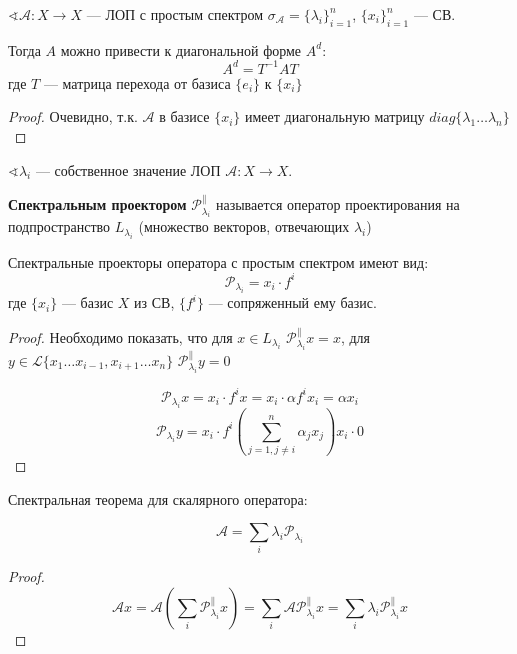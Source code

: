 \begin{theorem}
    $\sphericalangle \mathcal A : X \to X$ --- ЛОП с простым спектром $\sigma_{\mathcal A} = \{\lambda_i\}_{i=1}^n$, $\{x_i\}_{i=1}^n$ --- СВ.

    Тогда $A$ можно привести к диагональной форме $A^d$:
    $$A^d = T^{-1} A T$$
    где $T$ --- матрица перехода от базиса $\{e_i\}$ к $\{x_i\}$
\end{theorem}
\begin{proof}
    Очевидно, т.к. $\mathcal A$ в базисе $\{x_i\}$ имеет диагональную матрицу $diag\{\lambda_1 \ldots \lambda_n\}$
\end{proof}

\begin{definition}
    $\sphericalangle \lambda_i$ --- собственное значение ЛОП $\mathcal A : X\to X$.

    \textbf{Спектральным проектором} $\mathcal P_{\lambda_i}^{\parallel}$ называется оператор проектирования на подпространство $L_{\lambda_i}$ (множество векторов, отвечающих $\lambda_i$)
\end{definition}

\begin{lemma}
    Спектральные проекторы оператора с простым спектром имеют вид:
    $$\mathcal P_{\lambda_i} = x_i \cdot f^i$$
    где $\{x_i\}$ --- базис $X$ из СВ, $\{f^i\}$ --- сопряженный ему базис.
\end{lemma}
\begin{proof}
    Необходимо показать, что для $x\in L_{\lambda_i}$ $\mathcal P_{\lambda_i}^{\parallel} x=x$, для $y\in \mathcal L\{x_1\ldots x_{i-1}, x_{i+1}\ldots x_n\}$ $\mathcal P_{\lambda_i}^{\parallel} y=0$

    $$\mathcal P_{\lambda_i} x = x_i \cdot f^i x = x_i \cdot \alpha f^i x_i = \alpha x_i$$
    $$\mathcal P_{\lambda_i} y = x_i \cdot f^i \left(\sum_{j=1, j\not=i}^n \alpha_jx_j \right) x_i \cdot 0$$
\end{proof}

\begin{theorem}
    Спектральная теорема для скалярного оператора:

    $$\mathcal A = \sum_i \lambda_i \mathcal P_{\lambda_i}$$
\end{theorem}
\begin{proof}
    $$\mathcal A x = \mathcal A\left( \sum_i \mathcal P_{\lambda_i}^{\parallel} x \right) = \sum_i \mathcal A \mathcal P_{\lambda_i}^{\parallel} x = \sum_i \lambda_i \mathcal P_{\lambda_i}^{\parallel} x$$
\end{proof}

